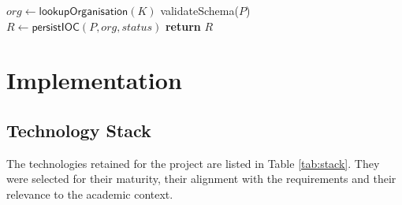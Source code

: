 \documentclass[12pt,a4paper,oneside]{book}
\begin{document}
{{\begin{algorithm}[!h]
$\textit{org} \gets \textsf{lookupOrganisation}(K)$\;
\textsf{validateSchema}($P$)\;
$R \gets \textsf{persistIOC}(P, \textit{org}, \textit{status})$\;
\textbf{return} $R$\;
\end{algorithm}

\section{Implementation}

\subsection{Technology Stack}

The technologies retained for the project are listed in
Table \ref{tab:stack}. They were selected for their maturity, their
alignment with the requirements and their relevance to the academic
context.

}}
\end{document}
